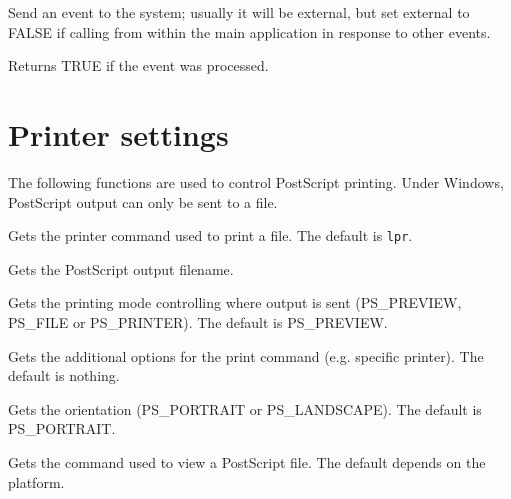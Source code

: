 \label{wxsendevent}


Send an event to the system; usually it will be external, but set
external to FALSE if calling from within the main application in
response to other events.

Returns TRUE if the event was processed.

\section{Printer settings}\label{printersettings}

The following functions are used to control PostScript printing. Under
Windows, PostScript output can only be sent to a file.



Gets the printer command used to print a file. The default is {\tt lpr}.



Gets the PostScript output filename.



Gets the printing mode controlling where output is sent (PS\_PREVIEW, PS\_FILE or PS\_PRINTER).
The default is PS\_PREVIEW.



Gets the additional options for the print command (e.g. specific printer). The default is nothing.



Gets the orientation (PS\_PORTRAIT or PS\_LANDSCAPE). The default is PS\_PORTRAIT.



Gets the command used to view a PostScript file. The default depends on the platform.

